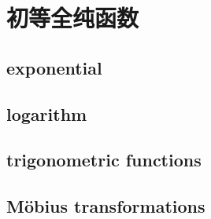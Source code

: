 \section{初等全纯函数}
\label{b3:sec:0103}


\subsection{exponential}
\label{b3:subsec:010301}

\subsection{logarithm}
\label{b3:subsec:010302}

\subsection{trigonometric functions}
\label{b3:subsec:010303}

\subsection{Möbius transformations}
\label{b3:subsec:010304}


